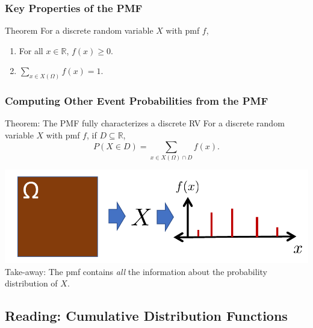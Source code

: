 \documentclass[12pt, block=fill]{beamer}
\newcommand{\R}{\mathbb{R}}
\begin{document}
 
\begin{frame}
  \frametitle{Key Properties of the PMF}

\begin{block}{Theorem}
  For a discrete random variable $X$ with pmf $f$, 
  
  \begin{enumerate}
  \item For all $x \in \R$, $f(x) \geq 0$.
  \item $\sum_{x \in X(\Omega)} f(x) = 1$.
  \end{enumerate}
\end{block}
  
\end{frame}
 
 
\begin{frame}
  \frametitle{Computing Other Event Probabilities from the PMF}

\begin{block}{Theorem: The PMF fully characterizes a discrete RV}
  For a discrete random variable $X$ with pmf $f$, if $D \subseteq \R$,
  $$  P(X \in D) = \sum_{x \in X(\Omega) \cap D } f(x).$$
\end{block}
\includegraphics[width= \textwidth]{figures/pmf_to_events} Take-away:
The pmf contains \textit{all} the information about the probability
distribution of $X$.
\end{frame}
 
\subsection{Reading: Cumulative Distribution Functions}
\end{document}
